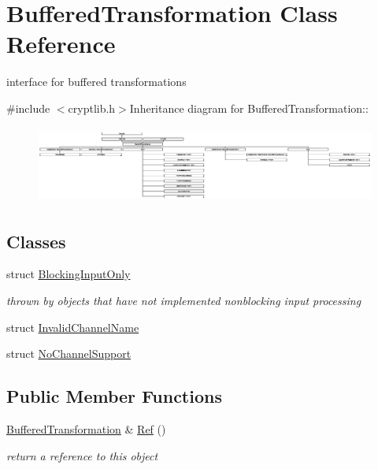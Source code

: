 \hypertarget{class_buffered_transformation}{
\section{BufferedTransformation Class Reference}
\label{class_buffered_transformation}
}


interface for buffered transformations  


{\ttfamily \#include $<$cryptlib.h$>$}Inheritance diagram for BufferedTransformation::\begin{figure}[H]
\begin{center}
\leavevmode
\includegraphics[height=2.5419cm]{class_buffered_transformation}
\end{center}
\end{figure}
\subsection*{Classes}
\begin{DoxyCompactItemize}
\item 
struct \hyperlink{struct_buffered_transformation_1_1_blocking_input_only}{BlockingInputOnly}
\begin{DoxyCompactList}\small\item\em thrown by objects that have not implemented nonblocking input processing \item\end{DoxyCompactList}\item 
struct \hyperlink{struct_buffered_transformation_1_1_invalid_channel_name}{InvalidChannelName}
\item 
struct \hyperlink{struct_buffered_transformation_1_1_no_channel_support}{NoChannelSupport}
\end{DoxyCompactItemize}
\subsection*{Public Member Functions}
\begin{DoxyCompactItemize}
\item 
\hyperlink{class_buffered_transformation}{BufferedTransformation} \& \hyperlink{class_buffered_transformation_a25686ebe4c3ba26e7eeaae1dcd4d4215}{Ref} ()
\begin{DoxyCompactList}\small\item\em return a reference to this object \item\end{DoxyCompactList}\end{DoxyCompactItemize}
